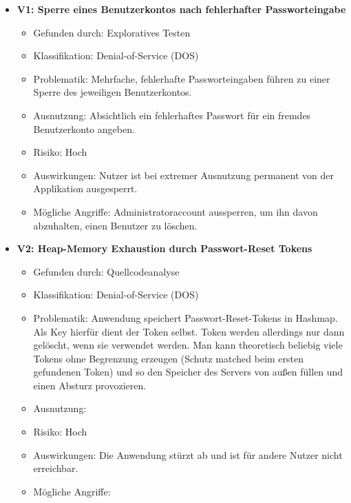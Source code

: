 \documentclass[12pt,DIV14,BCOR10mm,a4paper,parskip=half-,headsepline,headinclude,english,ngerman,bibliography=totocnumbered]{scrreprt}
\begin{document}
\begin{itemize}

  \hypertarget{vulnerability1}{}
  \item \textbf{V1: Sperre eines Benutzerkontos nach fehlerhafter Passworteingabe}
  \begin{itemize}
  \item Gefunden durch: Exploratives Testen
  \item Klassifikation: Denial-of-Service (DOS)
  \item Problematik: Mehrfache, fehlerhafte Passworteingaben führen zu einer Sperre des jeweiligen Benutzerkontos.
  \item Ausnutzung: Absichtlich ein fehlerhaftes Passwort für ein fremdes Benutzerkonto angeben.
  \item Risiko: Hoch
  \item Auswirkungen: Nutzer ist bei extremer Ausnutzung permanent von der Applikation ausgesperrt.
  \item Mögliche Angriffe: Administratoraccount aussperren, um ihn davon abzuhalten, einen Benutzer zu löschen.
  \end{itemize}

  \hypertarget{vulnerability2}{}
  \item \textbf{V2: Heap-Memory Exhaustion durch Passwort-Reset Tokens}
  \begin{itemize}
  \item Gefunden durch: Quellcodeanalyse
  \item Klassifikation: Denial-of-Service (DOS)
  \item Problematik: Anwendung speichert Passwort-Reset-Tokens in Hashmap. Als Key hierfür dient der Token selbst. Token werden allerdings nur dann gelöscht, wenn sie verwendet werden. Man kann theoretisch beliebig viele Tokens ohne Begrenzung erzeugen (Schutz matched beim ersten gefundenen Token) und so den Speicher des Servers von außen füllen und einen Absturz provozieren.
  \item Ausnutzung:
  \item Risiko: Hoch
  \item Auswirkungen: Die Anwendung stürzt ab und ist für andere Nutzer nicht erreichbar.
  \item Mögliche Angriffe:
  \end{itemize}


\end{itemize}
\end{document}
